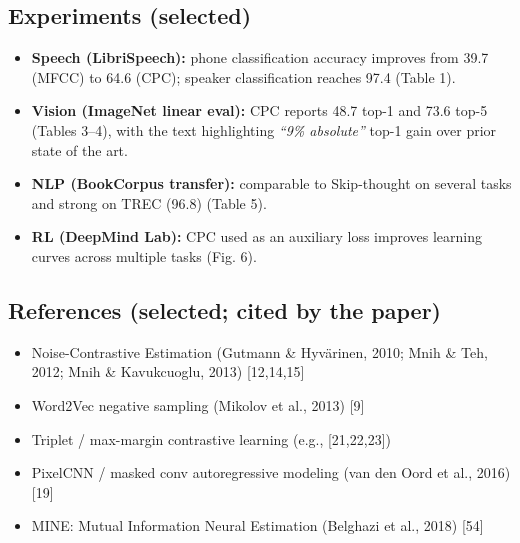 \documentclass{article}
\begin{document}
\subsection*{Experiments (selected)}
\begin{itemize}
  \item \textbf{Speech (LibriSpeech):} phone classification accuracy improves from 39.7 (MFCC) to 64.6 (CPC); speaker classification reaches 97.4 (Table 1).
  \item \textbf{Vision (ImageNet linear eval):} CPC reports 48.7 top-1 and 73.6 top-5 (Tables 3--4), with the text highlighting \emph{``9\% absolute''} top-1 gain over prior state of the art.
  \item \textbf{NLP (BookCorpus transfer):} comparable to Skip-thought on several tasks and strong on TREC (96.8) (Table 5).
  \item \textbf{RL (DeepMind Lab):} CPC used as an auxiliary loss improves learning curves across multiple tasks (Fig. 6).
\end{itemize}

\subsection*{References (selected; cited by the paper)}
\begin{itemize}
  \item Noise-Contrastive Estimation (Gutmann \& Hyv\"arinen, 2010; Mnih \& Teh, 2012; Mnih \& Kavukcuoglu, 2013) [12,14,15]
  \item Word2Vec negative sampling (Mikolov et al., 2013) [9]
  \item Triplet / max-margin contrastive learning (e.g., [21,22,23])
  \item PixelCNN / masked conv autoregressive modeling (van den Oord et al., 2016) [19]
  \item MINE: Mutual Information Neural Estimation (Belghazi et al., 2018) [54]
\end{itemize}
\end{document}
